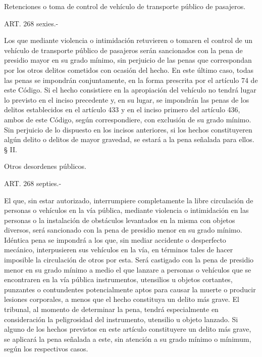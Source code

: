     Retenciones o toma de control de vehículo de transporte público de pasajeros. 

    ART. 268 sexies.-

    Los que mediante violencia o intimidación retuvieren o tomaren el control de un vehículo de transporte público de pasajeros serán sancionados con la pena de presidio mayor en su grado mínimo, sin perjuicio de las penas que correspondan por los otros delitos cometidos con ocasión del hecho. En este último caso, todas las penas se impondrán conjuntamente, en la forma prescrita por el artículo 74 de este Código.
    Si el hecho consistiere en la apropiación del vehículo no tendrá lugar lo previsto en el inciso precedente y, en su lugar, se impondrán las penas de los delitos establecidos en el artículo 433 y en el inciso primero del artículo 436, ambos de este Código, según correspondiere, con exclusión de su grado mínimo.
    Sin perjuicio de lo dispuesto en los incisos anteriores, si los hechos constituyeren algún delito o delitos de mayor gravedad, se estará a la pena señalada para ellos.
    § II.

    Otros desordenes públicos.








    ART. 268 septies.-

    El que, sin estar autorizado, interrumpiere completamente la libre circulación de personas o vehículos en la vía pública, mediante violencia o intimidación en las personas o la instalación de obstáculos levantados en la misma con objetos diversos, será sancionado con la pena de presidio menor en su grado mínimo. Idéntica pena se impondrá a los que, sin mediar accidente o desperfecto mecánico, interpusieren sus vehículos en la vía, en términos tales de hacer imposible la circulación de otros por esta.
    Será castigado con la pena de presidio menor en su grado mínimo a medio el que lanzare a personas o vehículos que se encontraren en la vía pública instrumentos, utensilios u objetos cortantes, punzantes o contundentes potencialmente aptos para causar la muerte o producir lesiones corporales, a menos que el hecho constituya un delito más grave. El tribunal, al momento de determinar la pena, tendrá especialmente en consideración la peligrosidad del instrumento, utensilio u objeto lanzado.
    Si alguno de los hechos previstos en este artículo constituyere un delito más grave, se aplicará la pena señalada a este, sin atención a su grado mínimo o mínimum, según los respectivos casos.



